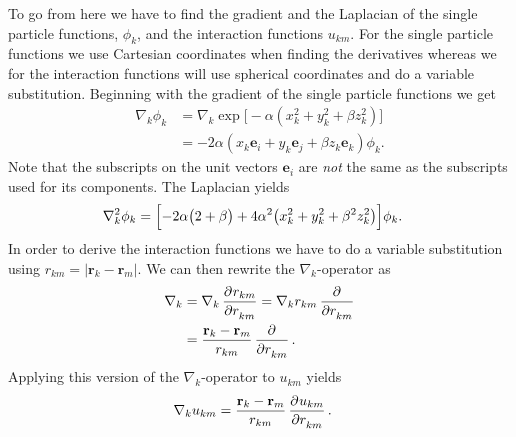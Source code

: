 \documentclass[
    a4paper, aps, twocolumn, floatfix, superscriptaddress, nofootinbib]{revtex4-1}
\newcommand{\vf}{\mathbf}
\newcommand{\1}{\mathds{1}}
\begin{document}
            To go from here we have to find the gradient and the Laplacian of
            the single particle functions, $\phi_k$, and the interaction
            functions $u_{km}$. For the single particle functions we use
            Cartesian coordinates when finding the derivatives whereas we for
            the interaction functions will use spherical coordinates and do a
            variable substitution. Beginning with the gradient of the single
            particle functions we get
            \begin{align}
                \nabla_k\phi_k
                &=
                \nabla_k\exp\bigl[
                    -\alpha(x_k^2 + y_k^2 + \beta z_k^2)
                \bigr] \\
                &=
                -2\alpha
                (x_k\vf{e}_i + y_k\vf{e}_j + \beta z_k\vf{e}_k)
                \phi_k.
            \end{align}
            Note that the subscripts on the unit vectors $\vf{e}_i$ are
            \textit{not} the same as the subscripts used for its components. The
            Laplacian yields
            \begin{align}
                \nabla_k^2\phi_k
                &=
                \Bigl[
                    -2\alpha
                    \big(
                        2 + \beta
                    \bigr)
                    + 4\alpha^2
                    \bigl(
                        x_k^2 + y_k^2 + \beta^2z_k^2
                    \bigr)
                \Bigr]
                \phi_k.
            \end{align}
            In order to derive the interaction functions we have to do a
            variable substitution using $r_{km} = |\vf{r}_k - \vf{r}_m|$. We can
            then rewrite the $\nabla_k$-operator as
            \begin{align}
                \nabla_k
                &=
                \nabla_k
                \dpd[]{r_{km}}{r_{km}}
                =
                \nabla_k r_{km} \dpd[]{}{r_{km}}
                \\
                &=
                \frac{\vf{r}_k - \vf{r}_m}{r_{km}}\dpd[]{}{r_{km}}.
            \end{align}
            Applying this version of the $\nabla_k$-operator to $u_{km}$ yields
            \begin{align}
                \nabla_k u_{km}
                &=
                \frac{\vf{r}_k - \vf{r}_m}{r_{km}}
                \dpd[]{u_{km}}{r_{km}}.
            \end{align}
\end{document}
